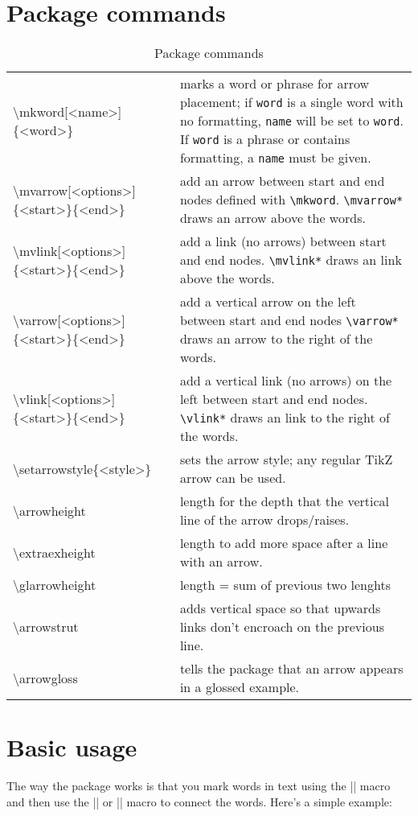 \documentclass[11pt]{article}
\newcommand*{\pkg}[1]{\texttt{#1}}
\newcommand*{\bs}{\textbackslash}
\begin{document}
\section{Package commands}
\begin{table}[htpb]
\centering
\begin{tabularx}{\textwidth}{t{l}X}
\toprule
\bs mkword[<name>]\{<word>\} & marks a word or phrase for arrow placement; if \pkg{word} is a single word with no formatting, \pkg{name} will be set to \pkg{word}. If \pkg{word} is a phrase or contains formatting, a \pkg{name} must be given.\\
\bs mvarrow[<options>]\{<start>\}\{<end>\} & add an arrow between start and end nodes defined with \pkg{\bs mkword}. \pkg{\bs mvarrow*} draws an arrow above the words.\\
\bs mvlink[<options>]\{<start>\}\{<end>\} & add a link (no arrows) between start and end nodes. \pkg{\bs mvlink*} draws an link above the words. \\
\bs varrow[<options>]\{<start>\}\{<end>\} & add a vertical arrow on the left between start and end nodes \pkg{\bs varrow*} draws an arrow to the right of the words.\\
\bs vlink[<options>]\{<start>\}\{<end>\} & add a  vertical link (no arrows) on the left between start and end nodes. \pkg{\bs vlink*} draws an link to the right of the words. \\
\bs setarrowstyle\{<style>\} & sets the arrow style; any regular TikZ arrow can be used.\\
\bs arrowheight & length for the depth that the vertical line of the arrow drops/raises.\\
\bs extraexheight & length to add more space after a line with an arrow.\\
\bs glarrowheight & length = sum of previous two lenghts\\
\bs arrowstrut & adds vertical space so that upwards links don't encroach on the previous line.\\
\bs arrowgloss & tells the package that an arrow appears in a glossed example.\\
\bottomrule
\end{tabularx}
\caption{Package commands}
\end{table}
\section{Basic usage}
The way the package works is that you mark words in text using the |\mkword| macro and then use the |\mvarrow| or |\mvlink| macro to connect the words.  Here's a simple example:
\end{document}
